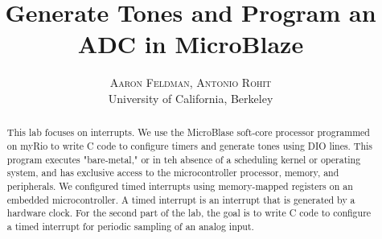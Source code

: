\documentclass[twoside]{article}
\title{\vspace{-15mm}\fontsize{24pt}{10pt}\selectfont\textbf{Generate Tones and Program an ADC in MicroBlaze}} %
\author{
\large
\textsc{Aaron Feldman, Antonio Rohit}\\[2mm] %
\normalsize University of California, Berkeley \\ %
\vspace{-5mm}
}
\date{}
\begin{document}
\maketitle %

\thispagestyle{fancy} %


\begin{abstract}

\noindent This lab focuses on interrupts. We use the MicroBlase soft-core processor programmed on myRio to write C code to configure timers and generate tones using DIO lines. This program executes "bare-metal," or in teh absence of a scheduling kernel or operating system, and has exclusive access to the microcontroller processor, memory, and peripherals. We configured timed interrupts using memory-mapped registers on an embedded microcontroller. A timed interrupt is an interrupt that is generated by a hardware clock. For the second part of the lab, the goal is to write C code to configure a timed interrupt for periodic sampling of an analog input.

\end{abstract}

\end{document}

